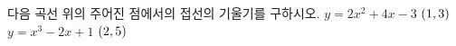 다음 곡선 위의 주어진 점에서의 접선의 기울기를 구하시오.
 $y=2x^2+4x-3$ \quad $(1{,}\mkern3mu\mathopen{}3)$
 $y=x^3-2x+1$ \quad $(2{,}\mkern3mu\mathopen{}5)$
